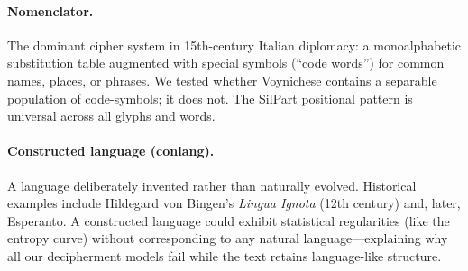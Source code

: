 \documentclass[11pt,a4paper]{article}
\begin{document}
\paragraph{Nomenclator.}
The dominant cipher system in 15th-century Italian diplomacy: a monoalphabetic substitution table augmented with special symbols (``code words'') for common names, places, or phrases.  We tested whether Voynichese contains a separable population of code-symbols; it does not.  The SilPart positional pattern is universal across all glyphs and words.

\paragraph{Constructed language (conlang).}
A language deliberately invented rather than naturally evolved.  Historical examples include Hildegard von Bingen's \textit{Lingua Ignota} (12th century) and, later, Esperanto.  A constructed language could exhibit statistical regularities (like the entropy curve) without corresponding to any natural language---explaining why all our decipherment models fail while the text retains language-like structure.
\end{document}
